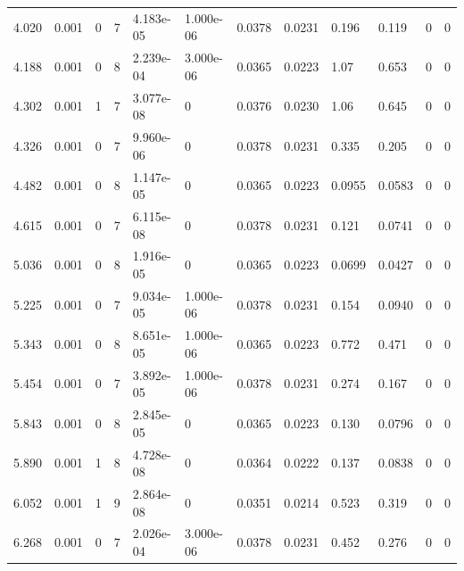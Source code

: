 \documentclass[preview]{standalone}
\begin{document}
{{\begin{tabular}{L{1.2cm}C{1.2cm} C{0.3cm}C{0.5cm} C{1.4cm}C{1.4cm} C{1.4cm}C{1.4cm} C{1.6cm}C{1.6cm} C{1.6cm}C{1.6cm}}
  4.020  &  0.001  & 0     &  7 &  4.183e-05  & 1.000e-06  &  0.0378&   0.0231& 0.196 & 0.119   &  0 & 0  \\ 
  4.188  &  0.001  & 0     &  8 &  2.239e-04  & 3.000e-06  &  0.0365&   0.0223& 1.07 & 0.653   &  0 & 0  \\ 
  4.302  &  0.001  & 1     &  7 &  3.077e-08  & 0  &  0.0376&   0.0230& 1.06 & 0.645   &  0 & 0  \\ 
  4.326  &  0.001  & 0     &  7 &  9.960e-06  & 0  &  0.0378&   0.0231& 0.335 & 0.205   &  0 & 0  \\ 
  4.482  &  0.001  & 0     &  8 &  1.147e-05  & 0  &  0.0365&   0.0223& 0.0955 & 0.0583   &  0 & 0  \\ 
  4.615  &  0.001  & 0     &  7 &  6.115e-08  & 0  &  0.0378&   0.0231& 0.121 & 0.0741   &  0 & 0  \\ 
  5.036  &  0.001  & 0     &  8 &  1.916e-05  & 0  &  0.0365&   0.0223& 0.0699 & 0.0427   &  0 & 0  \\ 
  5.225  &  0.001  & 0     &  7 &  9.034e-05  & 1.000e-06  &  0.0378&   0.0231& 0.154 & 0.0940   &  0 & 0  \\ 
  5.343  &  0.001  & 0     &  8 &  8.651e-05  & 1.000e-06  &  0.0365&   0.0223& 0.772 & 0.471   &  0 & 0  \\ 
  5.454  &  0.001  & 0     &  7 &  3.892e-05  & 1.000e-06  &  0.0378&   0.0231& 0.274 & 0.167   &  0 & 0  \\ 
  5.843  &  0.001  & 0     &  8 &  2.845e-05  & 0  &  0.0365&   0.0223& 0.130 & 0.0796   &  0 & 0  \\ 
  5.890  &  0.001  & 1     &  8 &  4.728e-08  & 0  &  0.0364&   0.0222& 0.137 & 0.0838   &  0 & 0  \\ 
  6.052  &  0.001  & 1     &  9 &  2.864e-08  & 0  &  0.0351&   0.0214& 0.523 & 0.319   &  0 & 0  \\ 
  6.268  &  0.001  & 0     &  7 &  2.026e-04  & 3.000e-06  &  0.0378&   0.0231& 0.452 & 0.276   &  0 & 0  \\ 
\hline 
\end{tabular} 

}}
\end{document}
